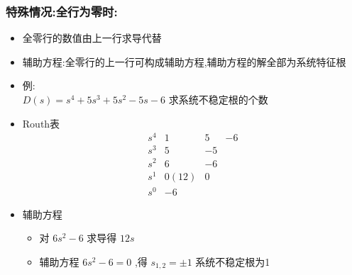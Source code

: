 \documentclass{article}
\begin{document}
\begin{frame}
\frametitle{特殊情况:全行为零时:}
\label{sec-2-4-2}

\begin{itemize}
\item 全零行的数值由上一行求导代替
\item 辅助方程:全零行的上一行可构成辅助方程,辅助方程的解全部为系统特征根
\end{itemize}
\begin{itemize}

\item 例:\\
\label{sec-2-4-2-1}%
$D(s)=s^{4}+5s^{3}+5s^{2}-5s-6$ 求系统不稳定根的个数


\item Routh表\\
\label{sec-2-4-2-2}%
\[
\begin{matrix}
s^{4} &  1 &  5 & -6 \\
s^{3} &  5 & -5 \\
s^{2} &  6 & -6 \\
s^{1} &  0(12)  & 0 \\
s^{0} &  -6
\end{matrix}
\]


\item 辅助方程
\label{sec-2-4-2-3}%
\begin{itemize}
\item 对 $6s^{2}-6$ 求导得 $12s$
\item 辅助方程 $6s^2-6=0$ ,得 $s_{1,2}=\pm 1$ 系统不稳定根为1
\end{itemize}

\end{itemize} %
\end{frame}
\end{document}

